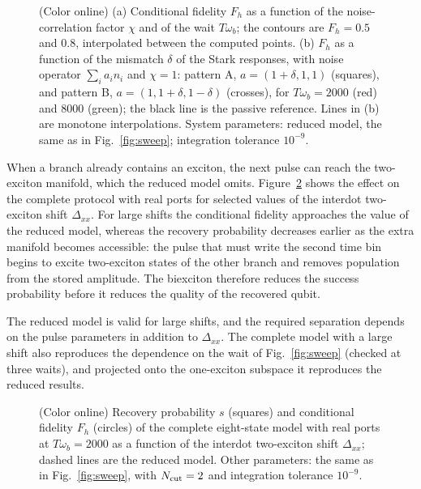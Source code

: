 \documentclass[aps,pra,preprint,groupedaddress,amsmath,amssymb,floatfix]{revtex4-2}
\begin{document}
\begin{figure}[t]
\centering
\resizebox{\columnwidth}{!}{}
\caption{(Color online) (a) Conditional fidelity $F_h$ as a function of the noise-correlation factor $\chi$ and of the wait $T\omega_b$; the contours are $F_h=0.5$ and $0.8$, interpolated between the computed points. (b) $F_h$ as a function of the mismatch $\delta$ of the Stark responses, with noise operator $\sum_i a_i n_i$ and $\chi=1$: pattern A, $a=(1+\delta,1,1)$ (squares), and pattern B, $a=(1,1+\delta,1-\delta)$ (crosses), for $T\omega_b=2000$ (red) and $8000$ (green); the black line is the passive reference. Lines in (b) are monotone interpolations. System parameters: reduced model, the same as in Fig.~\ref{fig:sweep}; integration tolerance $10^{-9}$.}
\label{fig:requirements}
\end{figure}

When a branch already contains an exciton, the next pulse can reach the two-exciton manifold, which the reduced model omits. Figure~\ref{fig:biexciton} shows the effect on the complete protocol with real ports for selected values of the interdot two-exciton shift $\Delta_{xx}$. For large shifts the conditional fidelity approaches the value of the reduced model, whereas the recovery probability decreases earlier as the extra manifold becomes accessible: the pulse that must write the second time bin begins to excite two-exciton states of the other branch and removes population from the stored amplitude. The biexciton therefore reduces the success probability before it reduces the quality of the recovered qubit.

The reduced model is valid for large shifts, and the required separation depends on the pulse parameters in addition to $\Delta_{xx}$. The complete model with a large shift also reproduces the dependence on the wait of Fig.~\ref{fig:sweep} (checked at three waits), and projected onto the one-exciton subspace it reproduces the reduced results.

\begin{figure}[h]
\centering
\resizebox{0.6\columnwidth}{!}{}
\caption{(Color online) Recovery probability $s$ (squares) and conditional fidelity $F_h$ (circles) of the complete eight-state model with real ports at $T\omega_b=2000$ as a function of the interdot two-exciton shift $\Delta_{xx}$; dashed lines are the reduced model. Other parameters: the same as in Fig.~\ref{fig:sweep}, with $N_{\rm cut}=2$ and integration tolerance $10^{-9}$.}
\label{fig:biexciton}
\end{figure}
\end{document}
